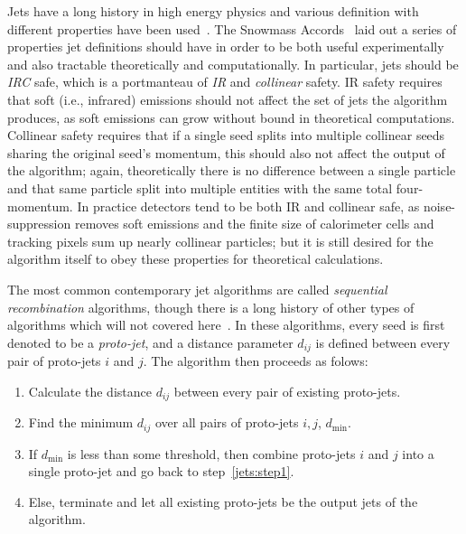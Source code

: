Jets have a long history in high energy physics and various definition with different properties have been used~\cite{Salam:2009jx}.
The Snowmass Accords~\cite{Huth:1990mi} laid out a series of properties jet definitions should have in order to be both useful experimentally and also tractable theoretically and computationally.
In particular, jets should be \textit{IRC} safe, which is a portmanteau of \textit{IR} and \textit{collinear} safety.
IR safety requires that soft (i.e., infrared) emissions should not affect the set of jets the algorithm produces, as soft emissions can grow without bound in theoretical computations.
Collinear safety requires that if a single seed splits into multiple collinear seeds sharing the original seed's momentum, this should also not affect the output of the algorithm; again, theoretically there is no difference between a single particle and that same particle split into multiple entities with the same total four-momentum.
In practice detectors tend to be both IR and collinear safe, as noise-suppression removes soft emissions and the finite size of calorimeter cells and tracking pixels sum up nearly collinear particles; but it is still desired for the algorithm itself to obey these properties for theoretical calculations.

The most common contemporary jet algorithms are called \textit{sequential recombination} algorithms, though there is a long history of other types of algorithms which will not covered here~\cite{Salam:2009jx}.
In these algorithms, every seed is first denoted to be a \textit{proto-jet}, and a distance parameter $d_{ij}$ is defined between every pair of proto-jets $i$ and $j$.
The algorithm then proceeds as folows:
\begin{enumerate}
  \item Calculate the distance $d_{ij}$ between every pair of existing proto-jets.\label{jets:step1}
  \item Find the minimum $d_{ij}$ over all pairs of proto-jets $i,j$, $d_\text{min}$.
  \item If $d_\text{min}$ is less than some threshold, then combine proto-jets $i$ and $j$ into a single proto-jet and go back to step~\ref{jets:step1}.
  \item Else, terminate and let all existing proto-jets be the output jets of the algorithm.
\end{enumerate}

